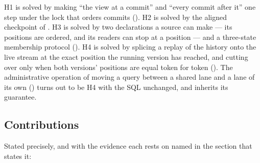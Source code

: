 \documentclass[11pt,a4paper]{article}
\renewcommand{\_}{\oldunderscore\allowbreak}
\begin{document}
H1 is solved by making ``the view at a commit'' and ``every commit after it'' one step under the
lock that orders commits (). H2 is solved by the aligned checkpoint of
. H3 is solved by two declarations a source can make --- its positions are
ordered, and its readers can stop at a position --- and a three-state membership protocol
(). H4 is solved by splicing a replay of the history onto the live stream at the exact
position the running version has reached, and cutting over only when both versions' positions are
equal token for token (). The administrative operation of moving a query between a
shared lane and a lane of its own () turns out to be H4 with the SQL unchanged, and
inherits its guarantee.

\subsection{Contributions}

Stated precisely, and with the evidence each rests on named in the section that states it:
\end{document}
